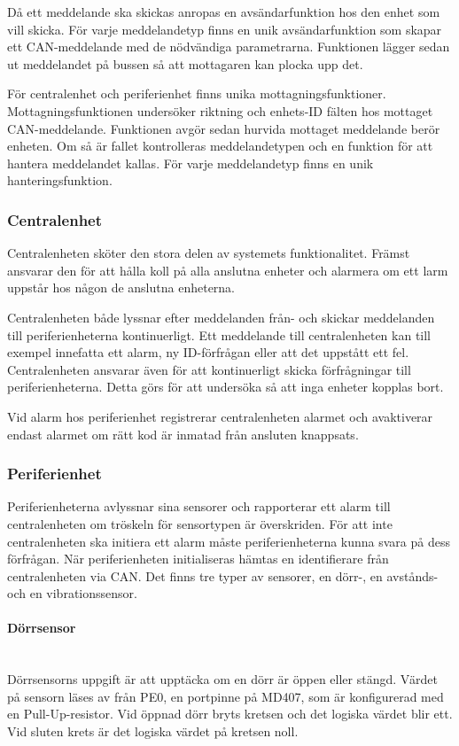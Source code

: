 \documentclass[a4paper]{article}
\newcommand{\subsubsubsection}[1]{\paragraph{#1}\mbox{}\\}
\begin{document}
Då ett meddelande ska skickas anropas en avsändarfunktion hos den enhet som vill skicka.
För varje meddelandetyp finns en unik avsändarfunktion som skapar ett CAN-meddelande med de nödvändiga parametrarna.
Funktionen lägger sedan ut meddelandet på bussen så att mottagaren kan plocka upp det.

För centralenhet och periferienhet finns unika mottagningsfunktioner.
Mottagningsfunktionen undersöker riktning och enhets-ID fälten hos mottaget CAN-meddelande.
Funktionen avgör sedan hurvida mottaget meddelande berör enheten.
Om så är fallet kontrolleras meddelandetypen och en funktion för att hantera meddelandet kallas.
För varje meddelandetyp finns en unik hanteringsfunktion.

\subsubsection{Centralenhet}
Centralenheten sköter den stora delen av systemets funktionalitet.
Främst ansvarar den för att hålla koll på alla anslutna enheter och alarmera om ett larm uppstår hos någon de anslutna enheterna.

Centralenheten både lyssnar efter meddelanden från- och skickar meddelanden till periferienheterna kontinuerligt.
Ett meddelande till centralenheten kan till exempel innefatta ett alarm, ny ID-förfrågan eller att det uppstått ett fel.
Centralenheten ansvarar även för att kontinuerligt skicka förfrågningar till periferienheterna.
Detta görs för att undersöka så att inga enheter kopplas bort.

Vid alarm hos periferienhet registrerar centralenheten alarmet och avaktiverar endast alarmet om rätt kod är inmatad från ansluten knappsats.


\subsubsection{Periferienhet}
Periferienheterna avlyssnar sina sensorer och rapporterar ett alarm till centralenheten om tröskeln för sensortypen är överskriden.
För att inte centralenheten ska initiera ett alarm måste periferienheterna kunna svara på dess förfrågan.
När periferienheten initialiseras hämtas en identifierare från centralenheten via CAN. Det finns tre typer av sensorer, en dörr-, en avstånds- och en vibrationssensor.

\subsubsubsection{Dörrsensor}
Dörrsensorns uppgift är att upptäcka om en dörr är öppen eller stängd. Värdet på sensorn läses av från PE0, en portpinne på MD407, som är konfigurerad med en Pull-Up-resistor. Vid öppnad dörr bryts kretsen och det logiska värdet blir ett. Vid sluten krets är det logiska värdet på kretsen noll.
\end{document}
